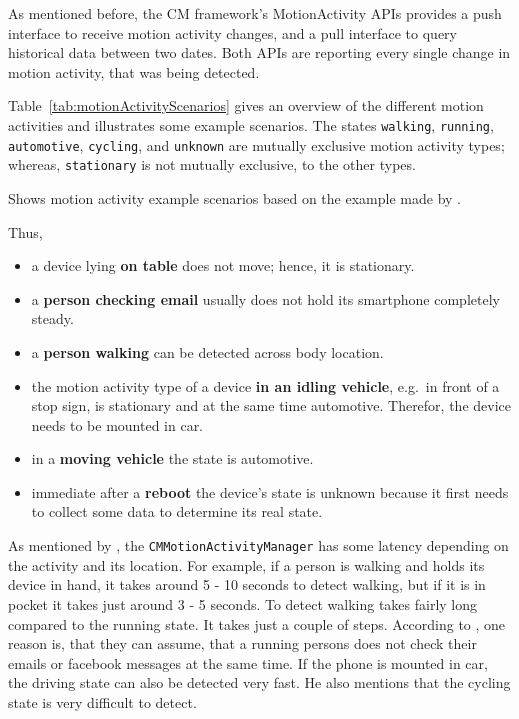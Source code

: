 As mentioned before, the \ac{CM} framework's MotionActivity \acsp{API} provides a push interface to receive motion activity changes, and a pull interface to query historical data between two dates. Both \acsp{API} are reporting every single change in motion activity, that was being detected.

Table~\ref{tab:motionActivityScenarios} gives an overview of the different motion activities and illustrates some example scenarios. The states \texttt{walking}, \texttt{running}, \texttt{automotive}, \texttt{cycling}, and \texttt{unknown} are mutually exclusive motion activity types; whereas, \texttt{stationary} is not mutually exclusive, to the other types.

\begin{table}
	
	\caption{Shows motion activity example scenarios based on the example made by \citet{apple:wwdc_2014_pham}.}
	\label{tab:motionActivityScenarios}
\end{table}


Thus,
\begin{itemize}
  \item a device lying \textbf{on table} does not move; hence, it is stationary.
  \item a \textbf{person checking email}  usually does not hold its smartphone completely steady.
  \item a \textbf{person walking} can be detected across body location.
  \item the motion activity type of a device \textbf{in an idling vehicle}, e.g.\ in front of a stop sign, is stationary and at the same time automotive. Therefor, the device needs to be mounted in car.
  \item in a \textbf{moving vehicle} the state is automotive.
  \item immediate after a \textbf{reboot} the device's state is unknown because it first needs to collect some data to determine its real state.
\end{itemize}

As mentioned by \citet{apple:wwdc_2014_pham}, the \texttt{CMMotionActivityManager} has some latency depending on the activity and its location. For example, if a person is walking and holds its device in hand, it takes around 5 - 10 seconds to detect walking, but if it is in pocket it takes just around 3 - 5 seconds. To detect walking takes fairly long compared to the running state. It takes just a couple of steps. According to \citet{apple:wwdc_2014_pham}, one reason is, that they can assume, that a running persons does not check their emails or facebook messages at the same time. If the phone is mounted in car, the driving state can also be detected very fast. He also mentions that the cycling state is very difficult to detect.

